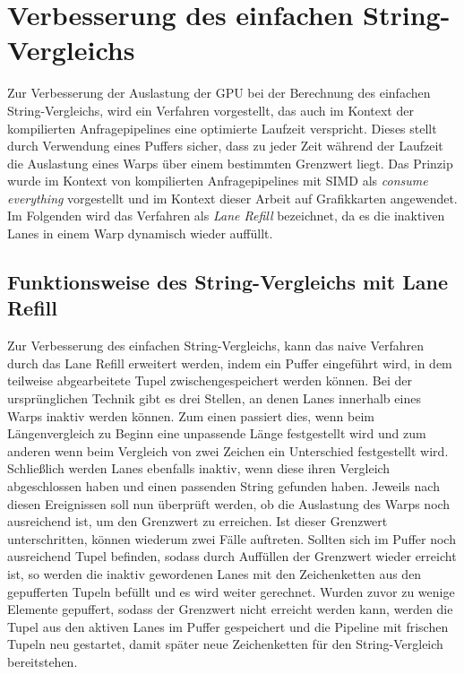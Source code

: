 \chapter{Verbesserung des einfachen String-Vergleichs}
\label{sec:equals_lane_refill}

Zur Verbesserung der Auslastung der GPU bei der Berechnung des einfachen String-Vergleichs, wird ein Verfahren vorgestellt, das auch im Kontext der kompilierten Anfragepipelines eine optimierte Laufzeit verspricht.
Dieses stellt durch Verwendung eines Puffers sicher, dass zu jeder Zeit während der Laufzeit die Auslastung eines Warps über einem bestimmten Grenzwert liegt.
Das Prinzip wurde im Kontext von kompilierten Anfragepipelines mit SIMD als \emph{consume everything} vorgestellt \cite{Lang2018} und im Kontext dieser Arbeit auf Grafikkarten angewendet.
Im Folgenden wird das Verfahren als \emph{Lane Refill} bezeichnet, da es die inaktiven Lanes in einem Warp dynamisch wieder auffüllt.

\section{Funktionsweise des String-Vergleichs mit Lane Refill}

Zur Verbesserung des einfachen String-Vergleichs, kann das naive Verfahren durch das Lane Refill erweitert werden, indem ein Puffer eingeführt wird, in dem teilweise abgearbeitete Tupel zwischengespeichert werden können.
Bei der ursprünglichen Technik gibt es drei Stellen, an denen Lanes innerhalb eines Warps inaktiv werden können.
Zum einen passiert dies, wenn beim Längenvergleich zu Beginn eine unpassende Länge festgestellt wird und zum anderen wenn beim Vergleich von zwei Zeichen ein Unterschied festgestellt wird.
Schließlich werden Lanes ebenfalls inaktiv, wenn diese ihren Vergleich abgeschlossen haben und einen passenden String gefunden haben.
Jeweils nach diesen Ereignissen soll nun überprüft werden, ob die Auslastung des Warps noch ausreichend ist, um den Grenzwert zu erreichen.
Ist dieser Grenzwert unterschritten, können wiederum zwei Fälle auftreten.
Sollten sich im Puffer noch ausreichend Tupel befinden, sodass durch Auffüllen der Grenzwert wieder erreicht ist, so werden die inaktiv gewordenen Lanes mit den Zeichenketten aus den gepufferten Tupeln befüllt und es wird weiter gerechnet.
Wurden zuvor zu wenige Elemente gepuffert, sodass der Grenzwert nicht erreicht werden kann, werden die Tupel aus den aktiven Lanes im Puffer gespeichert und die Pipeline mit frischen Tupeln neu gestartet, damit später neue Zeichenketten für den String-Vergleich bereitstehen.

